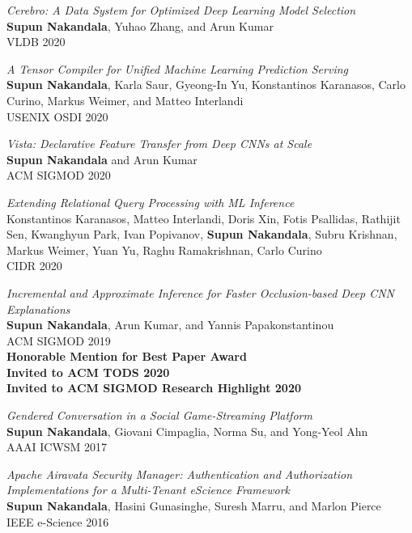 \documentclass[margin]{res}
\begin{document}
\begin{resume}
\par
\textit{Cerebro: A Data System for Optimized Deep Learning Model Selection} \\
\textbf{Supun Nakandala}, Yuhao Zhang, and Arun Kumar\\
VLDB 2020

\par
\textit{A Tensor Compiler for Unified Machine Learning Prediction Serving} \\
\textbf{Supun Nakandala}, Karla Saur, Gyeong-In Yu, Konstantinos Karanasos, Carlo Curino, Markus Weimer, and Matteo Interlandi\\
USENIX OSDI 2020

\par
\textit{Vista: Declarative Feature Transfer from Deep CNNs at Scale} \\
\textbf{Supun Nakandala} and Arun Kumar\\
ACM SIGMOD 2020


\par
\textit{Extending Relational Query Processing with ML Inference} \\
Konstantinos Karanasos, Matteo Interlandi, Doris Xin, Fotis Psallidas, Rathijit Sen, Kwanghyun Park, Ivan Popivanov, \textbf{Supun Nakandala}, Subru Krishnan, Markus Weimer, Yuan Yu, Raghu Ramakrishnan, Carlo Curino\\
CIDR 2020

\par
\textit{Incremental and Approximate Inference for Faster Occlusion-based Deep CNN Explanations} \\
\textbf{Supun Nakandala}, Arun Kumar, and Yannis Papakonstantinou \\
ACM SIGMOD 2019 \\
\textbf{Honorable Mention for Best Paper Award\\ Invited to ACM TODS 2020\\ Invited to ACM SIGMOD Research Highlight 2020}

\par
\textit{Gendered Conversation in a Social Game-Streaming Platform} \\
\textbf{Supun Nakandala}, Giovani Cimpaglia, Norma Su, and Yong-Yeol Ahn \\
AAAI ICWSM 2017

\par
\textit{Apache Airavata Security Manager: Authentication and Authorization Implementations for a Multi-Tenant eScience Framework
} \\
\textbf{Supun Nakandala}, Hasini Gunasinghe, Suresh Marru, and Marlon Pierce\\
IEEE e-Science 2016


\end{resume}
\end{document}
